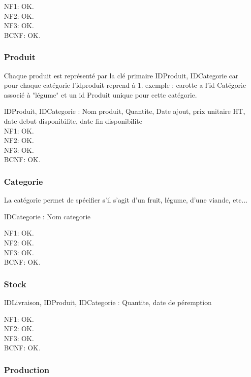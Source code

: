 \documentclass[a4paper, 12pt]{report}
\begin{document}
\begin{spacing}{1.2}
NF1: OK.\\
NF2: OK.\\
NF3: OK.\\
BCNF: OK.\\

\textcolor{colortitre3}{\subsubsection*{Produit}}

Chaque produit est représenté par la clé primaire IDProduit, IDCategorie car pour chaque catégorie l'idproduit reprend à 1. exemple : carotte a l'id Catégorie associé à "légume" et un id Produit unique pour cette catégorie.

IDProduit, IDCategorie : Nom produit, Quantite, Date ajout, prix unitaire HT, date debut disponibilite, date fin disponibilite \\


NF1: OK.\\
NF2: OK.\\
NF3: OK.\\
BCNF: OK.\\

\textcolor{colortitre3}{\subsubsection*{Categorie}}

La catégorie permet de spécifier s'il s'agit d'un fruit, légume, d'une viande, etc...

IDCategorie : Nom categorie

NF1: OK.\\
NF2: OK.\\
NF3: OK.\\
BCNF: OK.\\

\textcolor{colortitre3}{\subsubsection*{Stock}}

IDLivraison, IDProduit, IDCategorie : Quantite, date de péremption

NF1: OK.\\
NF2: OK.\\
NF3: OK.\\
BCNF: OK.\\

\textcolor{colortitre3}{\subsubsection*{Production}}


\end{spacing}
\end{document}
